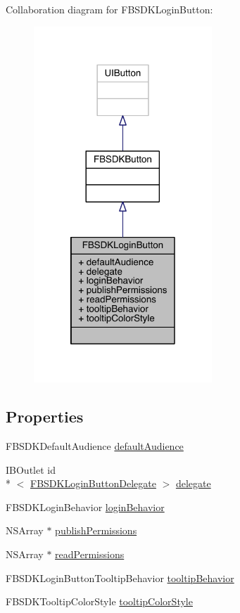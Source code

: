 Collaboration diagram for F\-B\-S\-D\-K\-Login\-Button\-:
\nopagebreak
\begin{figure}[H]
\begin{center}
\leavevmode
\includegraphics[width=190pt]{interface_f_b_s_d_k_login_button__coll__graph}
\end{center}
\end{figure}
\subsection*{Properties}
\begin{DoxyCompactItemize}
\item 
F\-B\-S\-D\-K\-Default\-Audience \hyperlink{interface_f_b_s_d_k_login_button_a27d7d78187d38c367957bac4b28c7ab6}{default\-Audience}
\item 
I\-B\-Outlet id\\*
$<$ \hyperlink{protocol_f_b_s_d_k_login_button_delegate-p}{F\-B\-S\-D\-K\-Login\-Button\-Delegate} $>$ \hyperlink{interface_f_b_s_d_k_login_button_a9334392431c0fb78a08fe4038a2a30fb}{delegate}
\item 
F\-B\-S\-D\-K\-Login\-Behavior \hyperlink{interface_f_b_s_d_k_login_button_afe30ee6f02e53feb1185bea33b5afd8e}{login\-Behavior}
\item 
N\-S\-Array $\ast$ \hyperlink{interface_f_b_s_d_k_login_button_a7b546773564a1961a0e9403e6b48b286}{publish\-Permissions}
\item 
N\-S\-Array $\ast$ \hyperlink{interface_f_b_s_d_k_login_button_a4086baec0d0b3203c6dd3b3d65d419f8}{read\-Permissions}
\item 
F\-B\-S\-D\-K\-Login\-Button\-Tooltip\-Behavior \hyperlink{interface_f_b_s_d_k_login_button_ad8da738c3ec8c6efbdada9547ef09757}{tooltip\-Behavior}
\item 
F\-B\-S\-D\-K\-Tooltip\-Color\-Style \hyperlink{interface_f_b_s_d_k_login_button_af2e1aa50591714452427fc87eade3e5e}{tooltip\-Color\-Style}
\end{DoxyCompactItemize}


